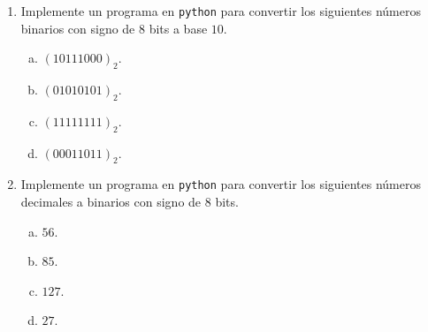 \documentclass[
	spanish,
	8pt,
	utf8,
	xcolor=table,
	handout,
	aspectratio=169,
	professionalfonts,
	notheorems,
	mathserif,
]{beamer}
\newcounter{savedenum}
\newcommand*{\resume}{\setcounter{enumi}{\thesavedenum}}
\begin{document}
\begin{frame}
	\begin{enumerate}
		\resume

		\item

		      Implemente un programa en \texttt{python} para convertir
		      los siguientes números binarios con signo de $8$ bits a
		      base $10$.

		      \begin{multicols}{4}

			      \begin{enumerate}[a)]
				      \item

				            $\left(10111000\right)_{2}$.

				      \item

				            $\left(01010101\right)_{2}$.

				      \item

				            $\left(11111111\right)_{2}$.

				      \item

				            $\left(00011011\right)_{2}$.
			      \end{enumerate}
		      \end{multicols}

		\item

		      Implemente un programa en \texttt{python} para convertir
		      los siguientes números decimales a binarios con signo de
		      $8$ bits.

		      \begin{multicols}{4}
			      \begin{enumerate}[a)]
				      \item

				            $56$.

				      \item

				            $85$.

				      \item

				            $127$.

				      \item

				            $27$.
			      \end{enumerate}
		      \end{multicols}


\end{enumerate}
\end{frame}
\end{document}
